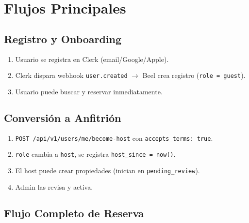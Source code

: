 \documentclass[12pt,a4paper]{report}
\begin{document}
\chapter{Flujos Principales}

\section{Registro y Onboarding}

\begin{enumerate}[leftmargin=*]
  \item Usuario se registra en Clerk (email/Google/Apple).
  \item Clerk dispara webhook \texttt{user.created} $\rightarrow$ Beel crea registro
        (\texttt{role = guest}).
  \item Usuario puede buscar y reservar inmediatamente.
\end{enumerate}

\section{Conversi\'on a Anfitri\'on}

\begin{enumerate}[leftmargin=*]
  \item \texttt{POST /api/v1/users/me/become-host} con \texttt{accepts\_terms: true}.
  \item \texttt{role} cambia a \texttt{host}, se registra \texttt{host\_since = now()}.
  \item El host puede crear propiedades (inician en \texttt{pending\_review}).
  \item Admin las revisa y activa.
\end{enumerate}

\section{Flujo Completo de Reserva}
\end{document}
